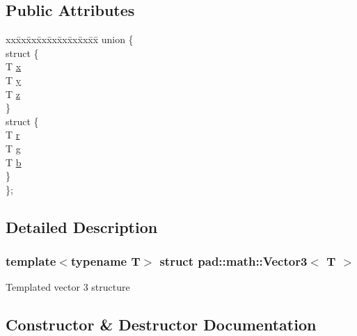 \subsection*{Public Attributes}
\begin{DoxyCompactItemize}
\item 
\begin{tabbing}
xx\=xx\=xx\=xx\=xx\=xx\=xx\=xx\=xx\=\kill
union \{\\
\>struct \{\\
\>\>T \mbox{\hyperlink{structpad_1_1math_1_1_vector3_acf0b6cc0b4fb0a077945332e816e4373}{x}}\\
\>\>T \mbox{\hyperlink{structpad_1_1math_1_1_vector3_af6d815461367ca4c2f85115453470934}{y}}\\
\>\>T \mbox{\hyperlink{structpad_1_1math_1_1_vector3_adcd03301042c390430955427765261e5}{z}}\\
\>\} \\
\>struct \{\\
\>\>T \mbox{\hyperlink{structpad_1_1math_1_1_vector3_a605d25418ec0079b504fcec127e7bea4}{r}}\\
\>\>T \mbox{\hyperlink{structpad_1_1math_1_1_vector3_ab0c584460b01a899fe4504c48c2037e4}{g}}\\
\>\>T \mbox{\hyperlink{structpad_1_1math_1_1_vector3_afaba266e93b4c9f0a14048934ac2f3f6}{b}}\\
\>\} \\
\}; \\

\end{tabbing}\end{DoxyCompactItemize}


\subsection{Detailed Description}
\subsubsection*{template$<$typename T$>$\newline
struct pad\+::math\+::\+Vector3$<$ T $>$}

Templated vector 3 structure 

\subsection{Constructor \& Destructor Documentation}
\mbox{\label{structpad_1_1math_1_1_vector3_a06aefc4e209e7e8ab954c9124e9f663f}} 
